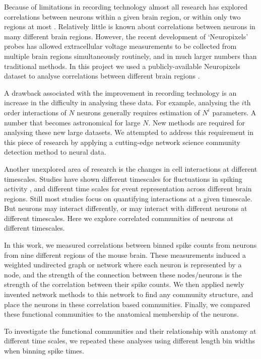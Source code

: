 Because of limitations in recording technology almost all research has explored correlations between neurons within a given brain region, or within only two regions at most \parencite{wierzynski, patterson, girard}. Relatively little is known about correlations between neurons in many different brain regions. However, the recent development of `Neuropixels' probes  \parencite{jun} has allowed extracellular voltage measurements to be collected from multiple brain regions simultaneously routinely, and in much larger numbers than traditional methods. In this project we used a publicly-available Neuropixels dataset to analyse correlations between different brain regions  \parencite{stringer}.

A drawback associated with the improvement in recording technology is an increase in the difficulty in analysing these data. For example, analysing the $i$th order interactions of $N$ neurons generally requires estimation of $N^i$ parameters. A number that becomes astronomical for large $N$. New methods are required for analysing these new large datasets. We attempted to address this requirement in this piece of research by applying a cutting-edge network science community detection method to neural data.

Another unexplored area of research is the changes in cell interactions at different timescales. Studies have shown different timescales for fluctuations in spiking activity \parencite{murray}, and different time scales for event representation \parencite{baldassano} across different brain regions. Still most studies focus on quantifying interactions at a given timescale. But neurons may interact differently, or may interact with different neurons at different timescales. Here we explore correlated communities of neurons at different timescales.

In this work, we measured correlations between binned spike counts from neurons from nine different regions of the mouse brain. These measurements induced a weighted undirected graph or network where each neuron is represented by a node, and the strength of the connection between these nodes/neurons is the strength of the correlation between their spike counts. We then applied newly invented network methods \parencite{humphries} to this network to find any community structure, and place the neurons in these correlation based communities. Finally, we compared these functional communities to the anatomical membership of the neurons.

To investigate the functional communities and their relationship with anatomy at different time scales, we repeated these analyses using different length bin widths when binning spike times.

